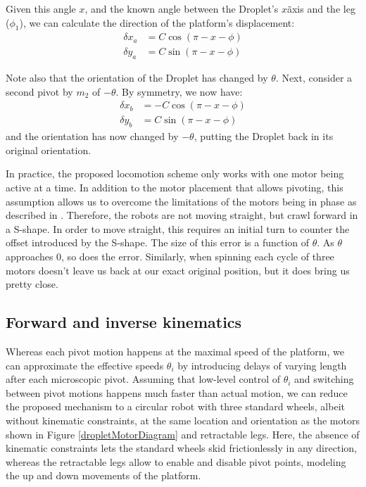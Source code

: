 \documentclass[letterpaper, 10pt, conference]{ieeeconf}
\begin{document}
Given this angle $x$, and the known angle between the Droplet's $x$\~axis and the leg ($\phi_1$), we can calculate the direction of the platform's displacement:
%
\begin{align}
\delta x_a &= C \cos(\pi - x - \phi)\\
\nonumber
\delta y_a &= C \sin(\pi - x - \phi)
\end{align}

Note also that the orientation of the Droplet has changed by $\theta$. Next, consider a second pivot by $m_2$ of $-\theta$. By symmetry, we now have:
%
\begin{align}
\delta x_b &= -C\cos(\pi -x -\phi)\\
\nonumber
\delta y_b &= C \sin(\pi - x - \phi)
\end{align}
%
and the orientation has now changed by $-\theta$, putting the Droplet back in its original orientation. 

In practice, the proposed locomotion scheme only works with one motor being active at a time. In addition to the motor placement that allows pivoting, this assumption allows us to overcome the limitations of the motors being in phase as described in \cite{Vartholomeos2005}. Therefore, the robots are not moving straight, but crawl forward in a S-shape. In order to move straight, this requires an initial turn to counter the offset introduced by the S-shape. The size of this error is a function of $\theta$. As $\theta$ approaches $0$, so does the error. Similarly, when spinning each cycle of three motors doesn't leave us back at our exact original position, but it does bring us pretty close.



\subsection{Forward and inverse kinematics}
Whereas each pivot motion happens at the maximal speed of the platform, we can approximate the effective speeds $\theta_i$ by introducing delays of varying length after each microscopic pivot. Assuming that low-level control of $\theta_i$ and switching between pivot motions happens much faster than actual motion, we can reduce the proposed mechanism to a circular robot with three standard wheels, albeit without kinematic constraints, at the same location and orientation as the motors shown in Figure \ref{dropletMotorDiagram} and retractable legs. Here, the absence of kinematic constraints lets the standard wheels skid frictionlessly in any direction, whereas the retractable legs allow to enable and disable pivot points, modeling the up and down movements of the platform. 
\end{document}
